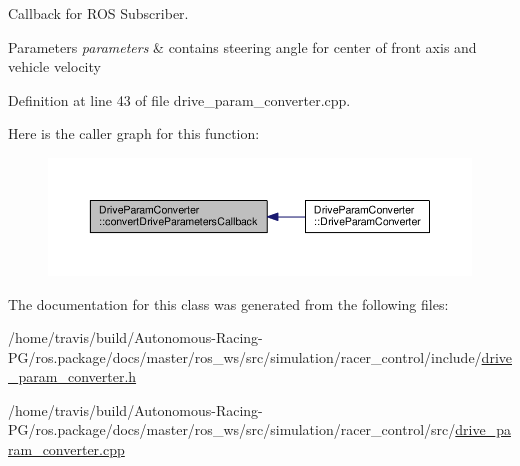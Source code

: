 Callback for R\+OS Subscriber. 


\begin{DoxyParams}{Parameters}
{\em parameters} & contains steering angle for center of front axis and vehicle velocity \\
\hline
\end{DoxyParams}


Definition at line 43 of file drive\+\_\+param\+\_\+converter.\+cpp.



Here is the caller graph for this function\+:
\nopagebreak
\begin{figure}[H]
\begin{center}
\leavevmode
\includegraphics[width=350pt]{class_drive_param_converter_aa101cfe15a7358f7816f9d6a14fd4261_icgraph}
\end{center}
\end{figure}




The documentation for this class was generated from the following files\+:\begin{DoxyCompactItemize}
\item 
/home/travis/build/\+Autonomous-\/\+Racing-\/\+P\+G/ros.\+package/docs/master/ros\+\_\+ws/src/simulation/racer\+\_\+control/include/\hyperlink{drive__param__converter_8h}{drive\+\_\+param\+\_\+converter.\+h}\item 
/home/travis/build/\+Autonomous-\/\+Racing-\/\+P\+G/ros.\+package/docs/master/ros\+\_\+ws/src/simulation/racer\+\_\+control/src/\hyperlink{drive__param__converter_8cpp}{drive\+\_\+param\+\_\+converter.\+cpp}\end{DoxyCompactItemize}
